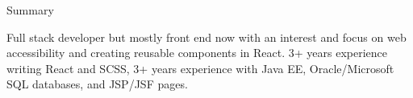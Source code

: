 \documentclass{resume} %
\begin{document}

\begin{rSection}{Summary}

Full stack developer but mostly front end now with an interest and focus on web accessibility and creating reusable components in React. 3+ years experience writing React and SCSS, 3+ years experience with Java EE, Oracle/Microsoft SQL databases, and JSP/JSF pages.

\end{rSection}


\end{document}
